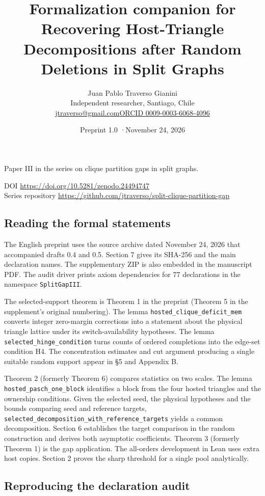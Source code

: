 \documentclass[english,11pt,a4paper]{article}
\title{Formalization companion for Recovering Host-Triangle Decompositions after Random Deletions in Split Graphs}
\author{Juan Pablo Traverso Gianini\\\small Independent researcher, Santiago, Chile\\\small\href{mailto:jtraverso@gmail.com}{jtraverso@gmail.com}\quad\href{https://orcid.org/0009-0003-6068-4096}{ORCID 0009-0003-6068-4096}}
\date{Preprint 1.0 \enspace·\enspace November 24, 2026}
\begin{document}
\raggedbottom\maketitle
\begin{center}Paper III in the series on clique partition gaps in split graphs.\end{center}
\noindent DOI \url{https://doi.org/10.5281/zenodo.24494747}\\
Series repository \url{https://github.com/jtraverso/split-clique-partition-gap}
\subsection{Reading the formal statements}\label{reading-the-formal-statements}

The English preprint uses the source archive dated November 24, 2026 that accompanied drafts 0.4 and 0.5. Section 7 gives its SHA-256 and the main declaration names. The supplementary ZIP is also embedded in the manuscript PDF. The audit driver prints axiom dependencies for 77 declarations in the namespace \texttt{SplitGapIII}.

The selected-support theorem is Theorem 1 in the preprint (Theorem 5 in the supplement's original numbering). The lemma \nolinkurl{hosted_clique_deficit_mem} converts integer zero-margin corrections into a statement about the physical triangle lattice under its switch-availability hypotheses. The lemma \nolinkurl{selected_hinge_condition} turns counts of ordered completions into the edge-set condition H4. The concentration estimates and cut argument producing a single suitable random support appear in §5 and Appendix B.

Theorem 2 (formerly Theorem 6) compares statistics on two scales. The lemma \nolinkurl{hosted_pasch_one_block} identifies a block from the four hosted triangles and the ownership conditions. Given the selected seed, the physical hypotheses and the bounds comparing seed and reference targets, \nolinkurl{selected_decomposition_with_reference_targets} yields a common decomposition. Section 6 establishes the target comparison in the random construction and derives both asymptotic coefficients. Theorem 3 (formerly Theorem 1) is the gap application. The all-orders development in Lean uses extra host copies. Section 2 proves the sharp threshold for a single pool analytically.

\subsection{Reproducing the declaration audit}\label{reproducing-the-declaration-audit}
\end{document}
